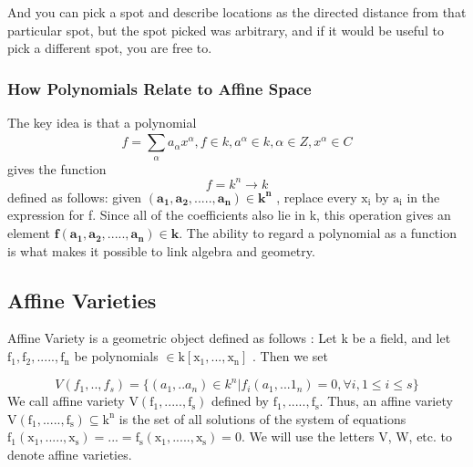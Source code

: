 \documentclass[11pt]{article}
\begin{document}
And you can pick a spot and describe locations as the directed distance from that particular spot, but the spot picked was arbitrary, and if it would be useful to pick a different spot, you are free to.

\subsubsection{How Polynomials Relate to Affine Space}
\cite{coxLittleOshea}The key idea is that a polynomial  
\begin{equation}
   f =  \sum_{\alpha}^{}{a_{\alpha}{x}^{\alpha} }, f \in k, a^{\alpha} \in k, \alpha \in Z, {x}^{\alpha} \in C 
\end{equation}
gives the function
\begin{equation}
   f =  k^n \rightarrow k
\end{equation}
defined as follows: given $\mathbf{(a_{1},a_2,.....,a_n) \in k^n}$ , replace every  $\mathrm{x_i}$ by $\mathrm{a_i}$ in the expression for f. Since all of the coefficients also lie in k, this operation gives an element $\mathbf{f(a_{1},a_2,.....,a_n) \in k}$.
The ability to regard a polynomial as a function is what makes it possible to link algebra and geometry.
\subsection{Affine Varieties} 
\cite{coxLittleOshea} Affine Variety is a geometric object defined as follows :\newline
 Let k be a field, and let $\mathrm{f_1,f_2,.....,f_n}$ be polynomials $\mathrm{\in k[x_1,...,x_n]}$ . Then we set 
 
\begin{equation}
   V(f_1,..,f_s)=\{(a_1,..a_n) \in k^n | f_i(a_1,...1_n)=0 , \forall i, 1 \le i \le s  \}
\end{equation}
We call affine variety $\mathrm{V(f_1,.....,f_s)}$ defined by  $\mathrm{f_1,.....,f_s}$. \newline
 Thus, an affine variety $\mathrm{V(f_1,.....,f_s) \subseteq k^n}$ is the set of all solutions of the system of equations  $\mathrm{f_1(x_1,.....,x_s)=...=f_s(x_1,.....,x_s)=0}$. We will use the letters V, W, etc. to denote affine varieties.
\end{document}
